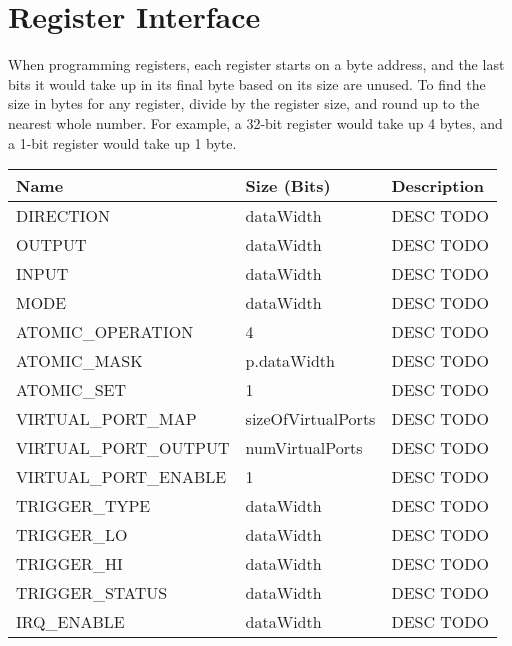 \section{Register Interface}
 
When programming registers, each register starts on a byte address, and the last bits it would take up in its final byte based on its size are unused. To find the size in bytes for any register, divide by the register size, and round up to the nearest whole number. For example, a 32-bit register would take up 4 bytes, and a 1-bit register would take up 1 byte.
 
\begin{longtable}[H]{
  | p{}
  | p{}
  | p{} |
  }
  \hline
  \textbf{Name} &   
  \textbf{Size (Bits)} &   
  \textbf{Description} \\ \hline \hline

  DIRECTION  &   
  dataWidth &   
  DESC TODO \\ \hline

  OUTPUT &   
  dataWidth &   
  DESC TODO \\ \hline

  INPUT &   
  dataWidth &   
  DESC TODO \\ \hline

  MODE &   
  dataWidth &   
  DESC TODO \\ \hline

  ATOMIC\_OPERATION &   
  4 &   
  DESC TODO \\ \hline

  ATOMIC\_MASK &   
  p.dataWidth &   
  DESC TODO \\ \hline

  ATOMIC\_SET &   
  1 &   
  DESC TODO \\ \hline

  VIRTUAL\_PORT\_MAP &   
  sizeOfVirtualPorts &   
  DESC TODO \\ \hline

  VIRTUAL\_PORT\_OUTPUT &   
  numVirtualPorts &   
  DESC TODO \\ \hline

  VIRTUAL\_PORT\_ENABLE &   
  1 &   
  DESC TODO \\ \hline

  TRIGGER\_TYPE &   
  dataWidth &   
  DESC TODO \\ \hline
  
  TRIGGER\_LO &   
  dataWidth &   
  DESC TODO \\ \hline
  
  TRIGGER\_HI &   
  dataWidth &   
  DESC TODO \\ \hline
  
  TRIGGER\_STATUS &   
  dataWidth &   
  DESC TODO \\ \hline
  
  IRQ\_ENABLE &   
  dataWidth &   
  DESC TODO \\ \hline

\end{longtable}

